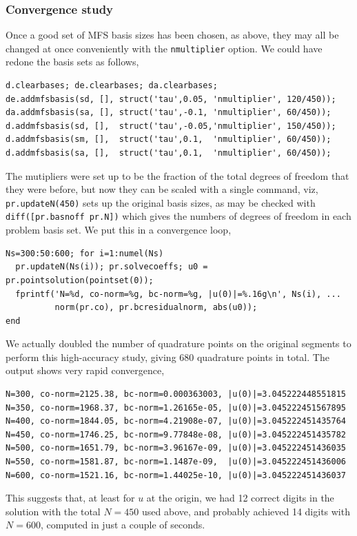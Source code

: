 \subsubsection{Convergence study}
Once a good set of MFS basis sizes has been chosen, as above, they
may all be changed at once conveniently with the {\tt nmultiplier} option.
We could have redone the basis sets as follows,
\begin{verbatim}
d.clearbases; de.clearbases; da.clearbases;
de.addmfsbasis(sd, [], struct('tau',0.05, 'nmultiplier', 120/450));
da.addmfsbasis(sa, [], struct('tau',-0.1, 'nmultiplier', 60/450));
d.addmfsbasis(sd, [],  struct('tau',-0.05,'nmultiplier', 150/450));
d.addmfsbasis(sm, [],  struct('tau',0.1,  'nmultiplier', 60/450));
d.addmfsbasis(sa, [],  struct('tau',0.1,  'nmultiplier', 60/450));
\end{verbatim}
The mutipliers were set up to be the fraction of the total degrees of freedom
that they were before, but now they can be scaled with a single command,
viz, {\tt pr.updateN(450)} sets up the original basis sizes,
as may be checked with {\tt diff([pr.basnoff pr.N])} which gives the
numbers of degrees of freedom in each problem basis set.
We put this in a convergence loop,
\begin{verbatim}
Ns=300:50:600; for i=1:numel(Ns)
  pr.updateN(Ns(i)); pr.solvecoeffs; u0 = pr.pointsolution(pointset(0));
  fprintf('N=%d, co-norm=%g, bc-norm=%g, |u(0)|=%.16g\n', Ns(i), ...
          norm(pr.co), pr.bcresidualnorm, abs(u0));
end
\end{verbatim}
We actually doubled the number of quadrature points on the original
segments to perform this high-accuracy study, giving 680 quadrature points in
total.
The output shows very rapid convergence,
\begin{verbatim}
N=300, co-norm=2125.38, bc-norm=0.000363003, |u(0)|=3.045222448551815
N=350, co-norm=1968.37, bc-norm=1.26165e-05, |u(0)|=3.045222451567895
N=400, co-norm=1844.05, bc-norm=4.21908e-07, |u(0)|=3.045222451435764
N=450, co-norm=1746.25, bc-norm=9.77848e-08, |u(0)|=3.045222451435782
N=500, co-norm=1651.79, bc-norm=3.96167e-09, |u(0)|=3.045222451436035
N=550, co-norm=1581.87, bc-norm=1.1487e-09,  |u(0)|=3.045222451436006
N=600, co-norm=1521.16, bc-norm=1.44025e-10, |u(0)|=3.045222451436037
\end{verbatim}
This suggests that, at least for $u$ at the origin, we had 12 correct
digits in the solution with the total $N=450$ used above,
and probably achieved 14 digits with $N=600$,
computed in just a couple of seconds.




